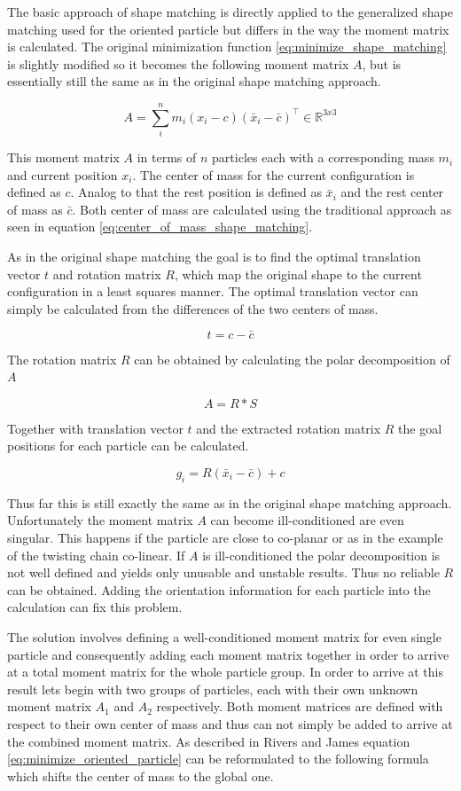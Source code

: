 The basic approach of shape matching is directly applied to the generalized shape matching used for the oriented particle but differs in the way the moment matrix is calculated. The original minimization function \ref{eq:minimize_shape_matching} is slightly modified so it becomes the following moment matrix $A$, but is essentially still the same as in the original shape matching approach.

\begin{equation}
A = \sum\limits_i^n m_i(x_i-c)(\bar{x}_i - \bar{c})^\top  \in \mathbb{R}^{3x3}
\label{eq:minimize_oriented_particle}
\end{equation}

This moment matrix $A$ in terms of $n$ particles each with a corresponding mass $m_i$ and current position $x_i$. The center of mass for the current configuration is defined as $c$. Analog to that the rest position is defined as $\bar{x}_i$ and the rest center of mass as $\bar{c}$. Both center of mass are calculated using the traditional approach as seen in equation \ref{eq:center_of_mass_shape_matching}.

As in the original shape matching the goal is to find the optimal translation vector $t$ and rotation matrix $R$, which map the original shape to the current configuration in a least squares manner. The optimal translation vector can simply be calculated from the differences of the two centers of mass.

\[
t = c - \bar{c}
\]

The rotation matrix $R$ can be obtained by calculating the polar decomposition of $A$

\[
A = R*S
\]

Together with translation vector $t$ and the extracted rotation matrix $R$ the goal positions for each particle can be calculated.

\[
g_i = R(\bar{x}_i-\bar{c})+c
\]

Thus far this is still exactly the same as in the original shape matching approach. Unfortunately  the moment matrix $A$ can become ill-conditioned are even singular. This happens if the particle are close to co-planar or as in the example of the twisting chain co-linear. If $A$ is ill-conditioned the polar decomposition is not well defined and yields only unusable and unstable results. Thus no reliable $R$ can be obtained. Adding the orientation information for each particle into the calculation can fix this problem.

The solution involves defining a well-conditioned moment matrix for even single particle and consequently adding each moment matrix together in order to arrive at a total moment matrix for the whole particle group. In order to arrive at this result lets begin with two groups of particles, each with their own unknown moment matrix $A_1$ and $A_2$ respectively. Both moment matrices are defined with respect to their own center of mass and thus can not simply be added to arrive at the combined moment matrix. As described in Rivers and James equation \ref{eq:minimize_oriented_particle} can be reformulated to the following formula which shifts the center of mass to the global one.

